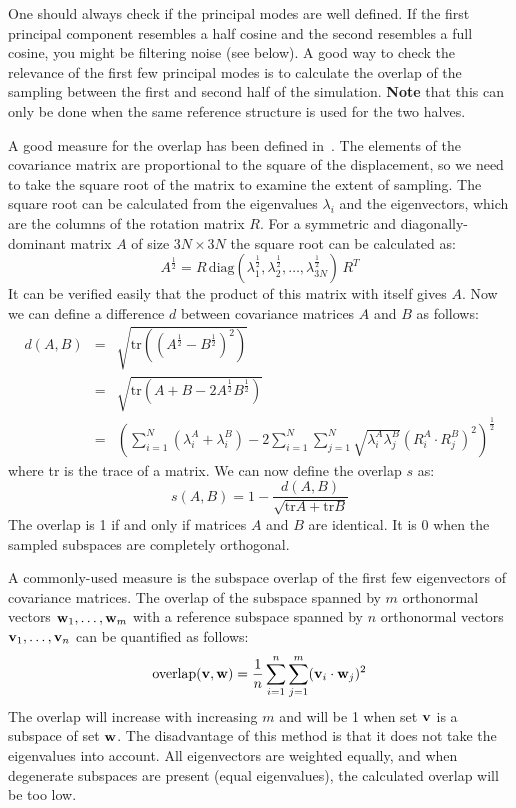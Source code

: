 One should always check if the principal modes are well defined.
If the first principal component resembles a half cosine and
the second resembles a full cosine, you might be filtering noise (see below).
A good way to check the relevance of the first few principal
modes is to calculate the overlap of the sampling between
the first and second half of the simulation.
{\bf Note} that this can only be done when the same reference structure is
used for the two halves.

A good measure for the overlap has been defined in~\cite{Hess2002b}.
The elements of the covariance matrix are proportional to the square
of the displacement, so we need to take the square root of the matrix
to examine the extent of sampling. The square root can be
calculated from the eigenvalues $\lambda_i$ and the eigenvectors,
which are the columns of the rotation matrix $R$.
For a symmetric and diagonally-dominant matrix $A$ of size $3N \times 3N$
the square root can be calculated as:
\begin{equation}
A^\frac{1}{2} = 
R \, \mbox{diag}(\lambda_1^\frac{1}{2},\lambda_2^\frac{1}{2},\ldots,\lambda_{3N}^\frac{1}{2}) \, R^T
\end{equation}
It can be verified easily that the product of this matrix with itself gives
$A$.
Now we can define a difference $d$ between covariance matrices $A$ and $B$
as follows:
\begin{eqnarray}
d(A,B) & = & \sqrt{\mbox{tr}\left(\left(A^\frac{1}{2} - B^\frac{1}{2}\right)^2\right)
}
\\ & = &
\sqrt{\mbox{tr}\left(A + B - 2 A^\frac{1}{2} B^\frac{1}{2}\right)}
\\ & = &
\left( \sum_{i=1}^N \left( \lambda_i^A + \lambda_i^B \right)
- 2 \sum_{i=1}^N \sum_{j=1}^N \sqrt{\lambda_i^A \lambda_j^B}
\left(R_i^A \cdot R_j^B\right)^2 \right)^\frac{1}{2}
\end{eqnarray}
where tr is the trace of a matrix.
We can now define the overlap $s$ as:
\begin{equation}
s(A,B) = 1 - \frac{d(A,B)}{\sqrt{\mbox{tr}A + \mbox{tr} B}}
\end{equation}
The overlap is 1 if and only if matrices $A$ and $B$ are identical.
It is 0 when the sampled subspaces are completely orthogonal.

A commonly-used measure is the subspace overlap of the first few
eigenvectors of covariance matrices.
The overlap of the subspace spanned by $m$ orthonormal vectors 
${\bf w}_1,\ldots,{\bf w}_m$ with a reference subspace spanned by 
$n$ orthonormal vectors ${\bf v}_1,\ldots,{\bf v}_n$
can be quantified as follows:
\begin{equation}
\mbox{overlap}({\bf v},{\bf w}) =
\frac{1}{n} \sum_{i=1}^n \sum_{j=1}^m ({\bf v}_i \cdot {\bf w}_j)^2
\end{equation}
The overlap will increase with increasing $m$ and will be 1 when
set ${\bf v}$ is a subspace of set ${\bf w}$.
The disadvantage of this method is that it does not take the eigenvalues
into account. All eigenvectors are weighted equally, and when
degenerate subspaces are present (equal eigenvalues), the calculated overlap
will be too low.

